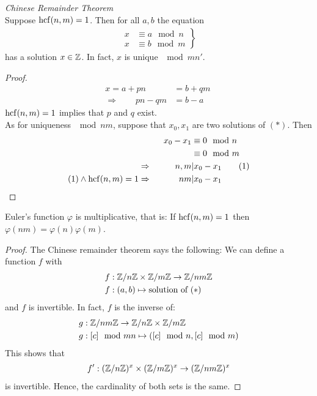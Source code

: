 \begin{tm}
	\emph{Chinese Remainder Theorem} \\
	Suppose $\operatorname{hcf}(n,m)=1$. Then for all $a,b$ the equation
	\begin{align*}
	\left.
	\begin{array}{ll}
	x & \equiv a \mod n \\
	x & \equiv b \mod m
	\end{array} \right\} \tag{$*$} 
	\end{align*}
	has a solution $x \in \mathbb Z$. In fact, $x$ is unique $\mod m n'$.
\end{tm}

\begin{proof}
	\begin{align*}
	x = a + pn & = b + qm\ \\
	\Rightarrow \qquad pn - qm & = b-a
	\end{align*}	
	$\operatorname{hcf}(n,m) = 1$ implies that $p$ and $q$ exist. \\
	As for uniqueness $\mod nm$, suppose that $x_0, x_1$ are two solutions of $(*)$. Then
	\begin{align*}
	& & x_0 - x_1 & \equiv 0 \mod n \\
	& & & \equiv 0 \mod m \\
	& \Rightarrow & \qquad n,m & | x_0 - x_1 \tag{1}\\
	 (1) \wedge \operatorname{hcf}(n,m) = 1 & \Rightarrow &  nm & | x_0-x_1
	\end{align*}
\end{proof}


	\begin{pp}
		Euler's function $\varphi$ is multiplicative, that is:
		If $\operatorname{hcf}(n,m)=1$ then $\varphi(nm) = \varphi(n) \varphi(m)$.
	\end{pp} 

\begin{proof}
	The Chinese remainder theorem says the following:
	We can define a function $f$ with
	\begin{align*}
	f&: \mathbb Z/n\mathbb Z \times \mathbb Z/m\mathbb Z \to \mathbb Z/nm\mathbb Z \\
	f&: (a,b) \mapsto  \text{solution of $(*)$}
	\end{align*}
	and $f$ is invertible. In fact, $f$ is the inverse of:
	\begin{align*}
	g& : \mathbb Z/nm\mathbb Z \to  \mathbb Z/n\mathbb Z \times \mathbb Z/m\mathbb Z\\
	g& : [c] \mod mn \mapsto \left([c] \mod n, [c] \mod m \right)
	\end{align*}
	This shows that 
	\begin{align*}
	f': (\mathbb Z/n\mathbb Z)^x \times (\mathbb Z/m\mathbb Z)^x \to (\mathbb Z/nm\mathbb Z)^x 
	\end{align*}
	is invertible. Hence, the cardinality of both sets is the same.
\end{proof}

